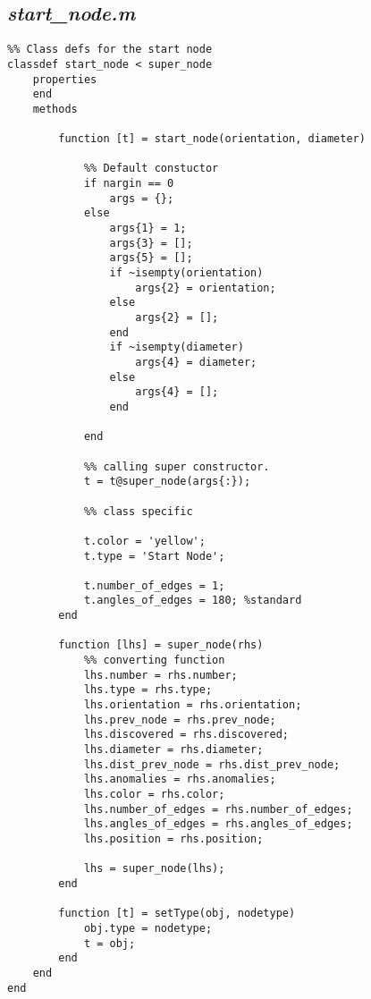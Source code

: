 \subsection{\emph{start\_node.m}}

\begin{lstlisting}
%% Class defs for the start node
classdef start_node < super_node
    properties
    end
    methods
        
        function [t] = start_node(orientation, diameter)
            
            %% Default constuctor
            if nargin == 0
                args = {};
            else
                args{1} = 1;
                args{3} = [];
                args{5} = [];
                if ~isempty(orientation)
                    args{2} = orientation;
                else 
                    args{2} = [];
                end
                if ~isempty(diameter)
                    args{4} = diameter;
                else
                    args{4} = [];
                end
                
            end
            
            %% calling super constructor.
            t = t@super_node(args{:});
            
            %% class specific
            
            t.color = 'yellow';
            t.type = 'Start Node';
            
            t.number_of_edges = 1;
            t.angles_of_edges = 180; %standard  
        end
        
        function [lhs] = super_node(rhs)
            %% converting function
            lhs.number = rhs.number;
            lhs.type = rhs.type;
            lhs.orientation = rhs.orientation;
            lhs.prev_node = rhs.prev_node;
            lhs.discovered = rhs.discovered;
            lhs.diameter = rhs.diameter;
            lhs.dist_prev_node = rhs.dist_prev_node;
            lhs.anomalies = rhs.anomalies;
            lhs.color = rhs.color;
            lhs.number_of_edges = rhs.number_of_edges;
            lhs.angles_of_edges = rhs.angles_of_edges;
            lhs.position = rhs.position;
            
            lhs = super_node(lhs);            
        end
       
        function [t] = setType(obj, nodetype)
            obj.type = nodetype;
            t = obj;
        end
    end
end

\end{lstlisting}

